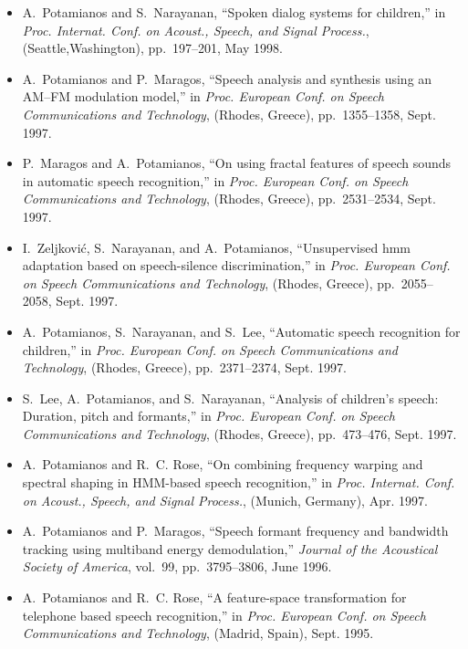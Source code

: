 \begin{itemize}
\item
A.~Potamianos and S.~Narayanan, ``Spoken dialog systems for children,'' in {\em
  Proc. Internat. Conf. on Acoust., Speech, and Signal Process.},
  (Seattle,Washington), pp.~197--201, May 1998.

\item
A.~Potamianos and P.~Maragos, ``Speech analysis and synthesis using an
  {AM}--{FM} modulation model,'' in {\em Proc. European Conf. on Speech
  Communications and Technology}, (Rhodes, Greece), pp.~1355--1358, Sept. 1997.

\item
P.~Maragos and A.~Potamianos, ``On using fractal features of speech sounds in
  automatic speech recognition,'' in {\em Proc. European Conf. on Speech
  Communications and Technology}, (Rhodes, Greece), pp.~2531--2534, Sept. 1997.

\item
I.~Zeljkovi\'c, S.~Narayanan, and A.~Potamianos, ``Unsupervised hmm adaptation
  based on speech-silence discrimination,'' in {\em Proc. European Conf. on
  Speech Communications and Technology}, (Rhodes, Greece), pp.~2055--2058,
  Sept. 1997.

\item
A.~Potamianos, S.~Narayanan, and S.~Lee, ``Automatic speech recognition for
  children,'' in {\em Proc. European Conf. on Speech Communications and
  Technology}, (Rhodes, Greece), pp.~2371--2374, Sept. 1997.

\item
S.~Lee, A.~Potamianos, and S.~Narayanan, ``Analysis of children's speech:
  Duration, pitch and formants,'' in {\em Proc. European Conf. on Speech
  Communications and Technology}, (Rhodes, Greece), pp.~473--476, Sept. 1997.

\item
A.~Potamianos and R.~C. Rose, ``On combining frequency warping and spectral
  shaping in {HMM}-based speech recognition,'' in {\em Proc. Internat. Conf. on
  Acoust., Speech, and Signal Process.}, (Munich, Germany), Apr. 1997.

\item
A.~Potamianos and P.~Maragos, ``Speech formant frequency and bandwidth tracking
  using multiband energy demodulation,'' {\em Journal of the Acoustical Society
  of America}, vol.~99, pp.~3795--3806, June 1996.

\item
A.~Potamianos and R.~C. Rose, ``A feature-space transformation for telephone
  based speech recognition,'' in {\em Proc. European Conf. on Speech
  Communications and Technology}, (Madrid, Spain), Sept. 1995.


\end{itemize}
